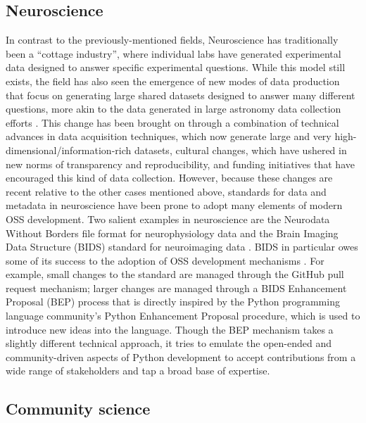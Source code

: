 \documentclass[
  number]{elsarticle}
\begin{document}
\subsection{Neuroscience}\label{neuroscience}

In contrast to the previously-mentioned fields, Neuroscience has
traditionally been a ``cottage industry'', where individual labs have
generated experimental data designed to answer specific experimental
questions. While this model still exists, the field has also seen the
emergence of new modes of data production that focus on generating large
shared datasets designed to answer many different questions, more akin
to the data generated in large astronomy data collection efforts
\citep{Koch2012-ve}. This change has been brought on through a
combination of technical advances in data acquisition techniques, which
now generate large and very high-dimensional/information-rich datasets,
cultural changes, which have ushered in new norms of transparency and
reproducibility, and funding initiatives that have encouraged this kind
of data collection. However, because these changes are recent relative
to the other cases mentioned above, standards for data and metadata in
neuroscience have been prone to adopt many elements of modern OSS
development. Two salient examples in neuroscience are the Neurodata
Without Borders file format for neurophysiology data
\citep{Rubel2022NWB} and the Brain Imaging Data Structure (BIDS)
standard for neuroimaging data \citep{Gorgolewski2016BIDS}. BIDS in
particular owes some of its success to the adoption of OSS development
mechanisms \citep{Poldrack2024BIDS}. For example, small changes to the
standard are managed through the GitHub pull request mechanism; larger
changes are managed through a BIDS Enhancement Proposal (BEP) process
that is directly inspired by the Python programming language community's
Python Enhancement Proposal procedure, which is used to introduce new
ideas into the language. Though the BEP mechanism takes a slightly
different technical approach, it tries to emulate the open-ended and
community-driven aspects of Python development to accept contributions
from a wide range of stakeholders and tap a broad base of expertise.

\subsection{Community science}\label{community-science}
\end{document}
